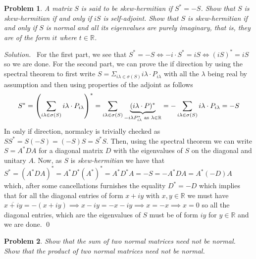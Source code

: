 \documentclass[12pt,a4paper]{article}
\newenvironment{solution}{%
  \par\noindent\textit{Solution.}\ }{\qed}
\theoremstyle{problemstyle}
\newtheorem{problem}{Problem}[section]
\def\bR{\mathbb{R}}
\begin{document}
\begin{problem}\label{prob:3-3}
A matrix $S$ is said to be \textit{skew-hermitian} if $S^* = -S$. Show that $S$ is skew-hermitian if and only if $iS$ is self-adjoint. Show that $S$ is skew-hermitian if and only if $S$ is normal and all its eigenvalues are purely imaginary, that is, they are of the form $it$ where $t \in \mathbb{R}$.
\end{problem}
\begin{solution}
	For the first part, we see that $S^*=-S\iff -i\cdot S^*=iS\iff (iS)^*=iS$ so we are done. For the second part, we can prove the if direction by using the spectral theorem to first write $S=\Sigma_{i\lambda\in\sigma(S)}i\lambda\cdot P_{i\lambda}$ with all the $\lambda$ being real by assumption and then using properties of the adjoint as follows
\[
	S^*=\qty(\sum_{i\lambda\in\sigma(S)}i\lambda\cdot P_{i\lambda})^*=\sum_{i\lambda\in\sigma(S)}\underbrace{(i\lambda\cdot P)^*}_{-i\lambda P_{i\lambda}^*\text{ as }\lambda\in\bR}=-\sum_{i\lambda\in\sigma(S)}i\lambda\cdot P_{i\lambda}=-S
\]
In only if direction, normalcy is trivially checked as $SS^*=S(-S)=(-S)S=S^*S$. Then, using the spectral theorem we can write $S=A^*DA$ for a diagonal matrix $D$ with the eigenvalues of $S$ on the diagonal and unitary $A$. Now, as $S$ is \textit{skew-hermitian} we have that $S^*=(A^*DA)^*=A^*D^*(A^*)^*=A^*D^*A=-S=-A^*DA=A^*(-D)A$ which, after some cancellations furnishes the equality $D^*=-D$ which implies that for all the diagonal entries of form $x+iy$ with $x,y\in\bR$ we must have $\overline{x+iy}=-(x+iy)\implies x-iy=-x-iy\implies x=-x\implies x=0$ so all the diagonal entries, which are the eigenvalues of $S$ must be of form $iy$ for $y\in\bR$ and we are done.
\end{solution}
\begin{problem}\label{prob:3-4}
Show that the sum of two normal matrices need not be normal. Show that the product of two normal matrices need not be normal.
\end{problem}
\end{document}
